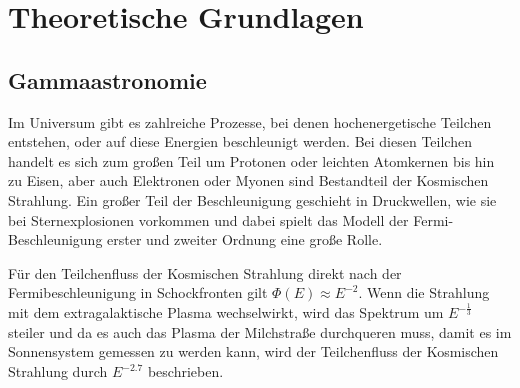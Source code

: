 \chapter{Theoretische Grundlagen}

\section{Gammaastronomie}
\label{sec:Gammaastronomie}

Im Universum gibt es zahlreiche Prozesse, bei denen hochenergetische Teilchen entstehen, oder auf diese Energien beschleunigt werden.
Bei diesen Teilchen handelt es sich zum großen Teil um Protonen oder leichten  Atomkernen bis hin zu Eisen, aber auch Elektronen oder Myonen
sind Bestandteil der Kosmischen Strahlung.
Ein großer Teil der Beschleunigung geschieht in Druckwellen, wie sie bei Sternexplosionen vorkommen und dabei spielt das Modell der
Fermi-Beschleunigung erster und zweiter Ordnung eine große Rolle.
%

Für den Teilchenfluss der Kosmischen Strahlung direkt nach der Fermibeschleunigung in Schockfronten gilt
$\Phi(E)\approx E^{-2}$.
Wenn die Strahlung mit dem extragalaktische Plasma wechselwirkt, wird das Spektrum um $E^{-\frac{1}{3}}$ steiler und
da es auch das Plasma der Milchstraße durchqueren muss, damit es im Sonnensystem gemessen zu werden kann, wird
der Teilchenfluss der Kosmischen Strahlung durch $E^{-2.7}$\cite[5]{Cosmic_rays} beschrieben.

